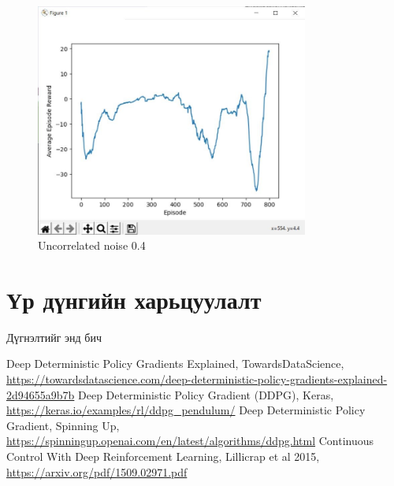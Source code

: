 \documentclass[12pt,A4]{report}
\begin{document}
\begin{figure}[H]
\centering
\includegraphics[width=0.8\textwidth]{./images/after_800_ep_04}
\caption{Uncorrelated noise 0.4}
\end{figure}

\section{Үр дүнгийн харьцуулалт}


Дүгнэлтийг энд бич


\singlespace
{}
\begin{thebibliography}{}
	Deep Deterministic Policy Gradients Explained, TowardsDataScience, \url{https://towardsdatascience.com/deep-deterministic-policy-gradients-explained-2d94655a9b7b}
	Deep Deterministic Policy Gradient (DDPG),  Keras, \url{https://keras.io/examples/rl/ddpg_pendulum/}
	Deep Deterministic Policy Gradient, Spinning Up, \url{https://spinningup.openai.com/en/latest/algorithms/ddpg.html}
	Continuous Control With Deep Reinforcement Learning, Lillicrap et al 2015, \url{https://arxiv.org/pdf/1509.02971.pdf}
\end{thebibliography}
\end{document}

